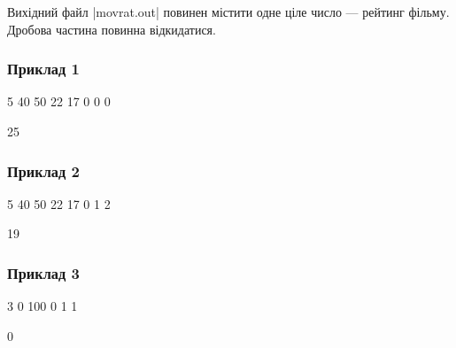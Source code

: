 \documentclass[12pt,a4paper]{article}
\begin{document}
Вихідний файл |movrat.out| повинен містити одне ціле число --- рейтинг фільму. Дробова частина повинна відкидатися.


\pagebreak


\subsubsection*{Приклад 1}

\textbf{}

\begin{codeblock}
5
40 50 22 17 0
0
0
\end{codeblock}

\textbf{}

\begin{codeblock}
25
\end{codeblock}


\subsubsection*{Приклад 2}

\textbf{}

\begin{codeblock}
5
40 50 22 17 0
1
2
\end{codeblock}

\textbf{}

\begin{codeblock}
19
\end{codeblock}


\subsubsection*{Приклад 3}

\textbf{}

\begin{codeblock}
3
0 100 0
1
1
\end{codeblock}

\textbf{}

\begin{codeblock}
0
\end{codeblock}
\end{document}
